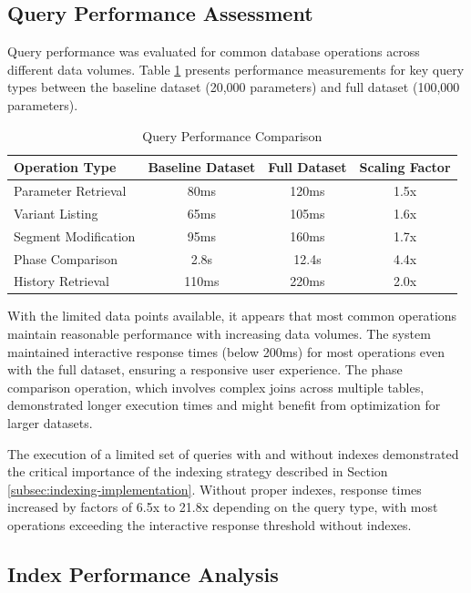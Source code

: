 \subsection{Query Performance Assessment}
\label{subsec:query-performance-assessment}

Query performance was evaluated for common database operations across different data volumes. Table \ref{tab:query-performance-comparison} presents performance measurements for key query types between the baseline dataset (20,000 parameters) and full dataset (100,000 parameters).

\begin{table}[h]
\centering
\caption{Query Performance Comparison}
\label{tab:query-performance-comparison}
\begin{tabular}{|l|c|c|c|}
\hline
\textbf{Operation Type} & \textbf{Baseline Dataset} & \textbf{Full Dataset} & \textbf{Scaling Factor} \\
\hline
Parameter Retrieval & 80ms & 120ms & 1.5x \\
\hline
Variant Listing & 65ms & 105ms & 1.6x \\
\hline
Segment Modification & 95ms & 160ms & 1.7x \\
\hline
Phase Comparison & 2.8s & 12.4s & 4.4x \\
\hline
History Retrieval & 110ms & 220ms & 2.0x \\
\hline
\end{tabular}
\end{table}

With the limited data points available, it appears that most common operations maintain reasonable performance with increasing data volumes. The system maintained interactive response times (below 200ms) for most operations even with the full dataset, ensuring a responsive user experience. The phase comparison operation, which involves complex joins across multiple tables, demonstrated longer execution times and might benefit from optimization for larger datasets.

The execution of a limited set of queries with and without indexes demonstrated the critical importance of the indexing strategy described in Section \ref{subsec:indexing-implementation}. Without proper indexes, response times increased by factors of 6.5x to 21.8x depending on the query type, with most operations exceeding the interactive response threshold without indexes.

\subsection{Index Performance Analysis}
\label{subsec:index-performance-analysis}


